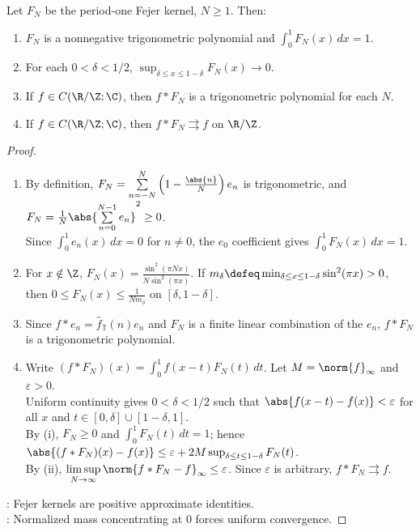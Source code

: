 \begin{theorem} \label{thm:fejer-periodic-approximation-identity} \\
Let $F_N$ be the period-one Fejer kernel, $N\geq1$. Then:
\begin{enumerate}[label=(\roman*)]
\setlength{\itemsep}{0pt}
\item $F_N$ is a nonnegative trigonometric polynomial and $\int_0^1 F_N(x)\,dx=1$.
\item For each $0<\delta<1/2$, $\sup_{\delta\leq x\leq1-\delta}F_N(x)\to0$.
\item If $f\in C(\R/\Z;\C)$, then $f*F_N$ is a trigonometric polynomial for each $N$.
\item If $f\in C(\R/\Z;\C)$, then $f*F_N\rightrightarrows f$ on $\R/\Z$.
\end{enumerate}
\begin{proof}
\begin{enumerate}[label=(\roman*)]
\setlength{\itemsep}{0pt}
\item By definition, $F_N=\sum\limits_{n=-N}^{N}\left(1-\frac{\abs{n}}{N}\right)e_n$ is trigonometric, and $F_N=\frac{1}{N}\abs{\sum\limits_{n=0}^{N-1}e_n}^2\geq0$.\\
Since $\int_0^1e_n(x)\,dx=0$ for $n\neq0$, the $e_0$ coefficient gives $\int_0^1F_N(x)\,dx=1$.
\item For $x\notin\Z$, $F_N(x)=\frac{\sin^2(\pi Nx)}{N\sin^2(\pi x)}$. If $m_\delta\defeq\min_{\delta\leq x\leq1-\delta}\sin^2(\pi x)>0$, then $0\leq F_N(x)\leq\frac{1}{Nm_\delta}$ on $[\delta,1-\delta]$.
\item Since $f*e_n=\widehat f_{\mathbb{T}}(n)e_n$ and $F_N$ is a finite linear combination of the $e_n$, $f*F_N$ is a trigonometric polynomial.
\item Write $(f*F_N)(x)=\int_0^1f(x-t)F_N(t)\,dt$. Let $M=\norm{f}_\infty$ and $\varepsilon>0$.\\
Uniform continuity gives $0<\delta<1/2$ such that $\abs{f(x-t)-f(x)}<\varepsilon$ for all $x$ and $t\in[0,\delta]\cup[1-\delta,1]$.\\
By (i), $F_N\geq0$ and $\int_0^1F_N(t)\,dt=1$; hence $\abs{(f*F_N)(x)-f(x)}\leq\varepsilon+2M\sup_{\delta\leq t\leq1-\delta}F_N(t)$.\\
By (ii), $\limsup\limits_{N\to\infty}\norm{f*F_N-f}_\infty\leq\varepsilon$. Since $\varepsilon$ is arbitrary, $f*F_N\rightrightarrows f$.
\end{enumerate}
: Fejer kernels are positive approximate identities.\\
: Normalized mass concentrating at $0$ forces uniform convergence.
\end{proof}
\end{theorem}

